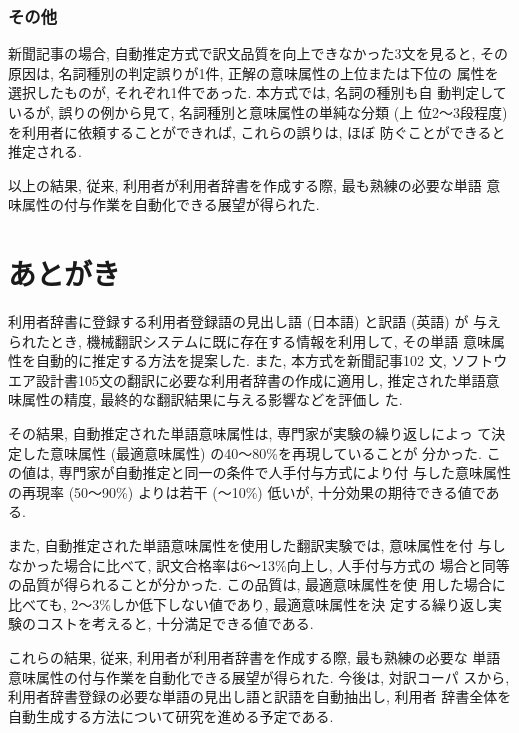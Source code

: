 \subsubsection{その他}

新聞記事の場合, 自動推定方式で訳文品質を向上できなかった3文を見ると, 
その原因は, 名詞種別の判定誤りが1件, 正解の意味属性の上位または下位の
属性を選択したものが, それぞれ1件であった. 本方式では, 名詞の種別も自
動判定しているが, 誤りの例から見て, 名詞種別と意味属性の単純な分類 (上
位2〜3段程度) を利用者に依頼することができれば, これらの誤りは, ほぼ
防ぐことができると推定される.  

以上の結果, 従来, 利用者が利用者辞書を作成する際, 最も熟練の必要な単語
意味属性の付与作業を自動化できる展望が得られた.  


\section{あとがき}
\label{sec:6}


利用者辞書に登録する利用者登録語の見出し語 (日本語) と訳語 (英語) が
与えられたとき, 機械翻訳システムに既に存在する情報を利用して, その単語
意味属性を自動的に推定する方法を提案した. また, 本方式を新聞記事102
文, ソフトウエア設計書105文の翻訳に必要な利用者辞書の作成に適用し, 
推定された単語意味属性の精度, 最終的な翻訳結果に与える影響などを評価し
た.  

その結果, 自動推定された単語意味属性は, 専門家が実験の繰り返しによっ
て決定した意味属性 (最適意味属性) の40〜80\%を再現していることが
分かった. この値は, 専門家が自動推定と同一の条件で人手付与方式により付
与した意味属性の再現率 (50〜90\%) よりは若干 (〜10\%) 低いが, 
十分効果の期待できる値である.  

また, 自動推定された単語意味属性を使用した翻訳実験では, 意味属性を付
与しなかった場合に比べて, 訳文合格率は6〜13\%向上し, 人手付与方式の
場合と同等の品質が得られることが分かった. この品質は, 最適意味属性を使
用した場合に比べても, 2〜3\%しか低下しない値であり, 最適意味属性を決
定する繰り返し実験のコストを考えると, 十分満足できる値である.  

これらの結果, 従来, 利用者が利用者辞書を作成する際, 最も熟練の必要な
単語意味属性の付与作業を自動化できる展望が得られた. 今後は, 対訳コーパ
スから, 利用者辞書登録の必要な単語の見出し語と訳語を自動抽出し, 利用者
辞書全体を自動生成する方法について研究を進める予定である.  





